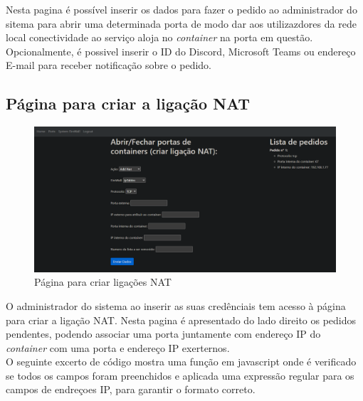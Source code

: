 Nesta pagina é possível inserir os dados para fazer o pedido ao administrador do
sitema para abrir uma determinada porta de modo dar aos utilizazdores da rede local
conectividade ao serviço aloja no \textit{container} na porta em questão. \\

Opcionalmente, é possivel inserir o ID do Discord, Microsoft Teams ou endereço E-mail
para receber notificação sobre o pedido.

\subsection{Página para criar a ligação NAT}

\begin{figure}[H]
\begin{center}
\includegraphics[width=16cm]{figs/criar nat 2.png}
\caption{Página para criar ligações NAT}
\label{fig:bookstack}
\end{center}
\end{figure}

O administrador do sistema ao inserir as suas credênciais tem acesso à página
para criar a ligação NAT. Nesta pagina é apresentado do lado direito
os pedidos pendentes, podendo associar uma porta juntamente com 
endereço IP do \textit{container} com uma porta e endereço IP exerternos. \\

O seguinte excerto de código mostra uma função em javascript onde é verificado
se todos os campos foram preenchidos e aplicada uma 
expressão regular para os campos de endreçoes IP, para garantir o formato correto.

